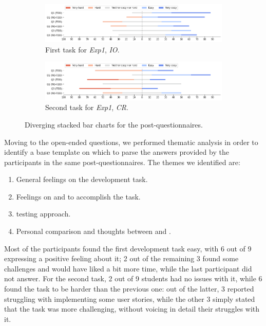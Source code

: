 \begin{figure}[htbp]
    \begin{subfigure}{\textwidth}
        \includegraphics[width=\textwidth]{figures/bar_charts/task1.png}
        \caption{First task for \textit{Exp1}, \textit{IO}.}
    \end{subfigure}
    
    \bigskip
    
    \begin{subfigure}{\textwidth}
        \includegraphics[width=\textwidth]{figures/bar_charts/task2.png}
        \caption{Second task for \textit{Exp1}, \textit{CR}.}
    \end{subfigure}
    
    \caption{Diverging stacked bar charts for the post-questionnaires.}
    \label{bar_charts}
\end{figure}

\newpage
Moving to the open-ended questions, we performed thematic analysis in order to identify a base template on which to parse the answers provided by the participants in the same post-questionnaires.
The themes we identified are:

\begin{enumerate}
    \item General feelings on the development task.
    \item Feelings on \tdd and \notdd to accomplish the task.
    \item \notdd testing approach.
    \item Personal comparison and thoughts between \tdd and \notdd.
\end{enumerate}

Most of the participants found the first development task easy, with 6 out of 9 expressing a positive feeling about it; 2 out of the remaining 3 found some challenges and would have liked a bit more time, while the last participant did not answer. 
For the second task, 2 out of 9 students had no issues with it, while 6 found the task to be harder than the previous one: out of the latter, 3 reported struggling with implementing some user stories, while the other 3 simply stated that the task was more challenging, without voicing in detail their struggles with it.

